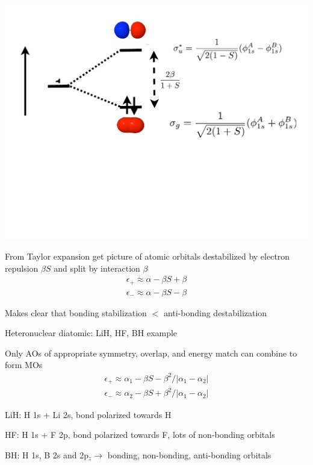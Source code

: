 \documentclass[11pt]{article}
\begin{document}
\begin{outline}
\begin{outline}
\begin{outline}
\begin{center}
     \includegraphics[scale=0.3]{Images/H2-MO}       
     \end{center}
   \item From Taylor expansion get picture of atomic orbitals destabilized by electron repulsion $\beta S$ and
     split by interaction $\beta$
     \begin{eqnarray*}
       \epsilon_+\approx \alpha-\beta S + \beta \\
       \epsilon_-\approx \alpha - \beta S - \beta
     \end{eqnarray*}
   \item Makes clear that bonding stabilization $<$ anti-bonding destabilization
   \end{outline}
 \item Heteronuclear diatomic: LiH, HF, BH example
   \begin{outline}
   \item Only AOs of appropriate symmetry, overlap, and energy match can
     combine to form MOs
     \begin{eqnarray*}
       \epsilon_+\approx \alpha_1- \beta S  - \beta^2/|\alpha_1-\alpha_2| \\
       \epsilon_-\approx \alpha_2 - \beta S + \beta^2/|\alpha_1-\alpha_2|
     \end{eqnarray*}
   \item LiH: H 1s + Li 2s, bond polarized towards H
   \item HF: H 1s + F 2p, bond polarized towards F, lots of non-bonding orbitals
   \item BH: H 1s, B 2s and 2p$_z \rightarrow$ bonding, non-bonding, anti-bonding orbitals

\end{outline}
\end{outline}
\end{outline}
\end{document}
